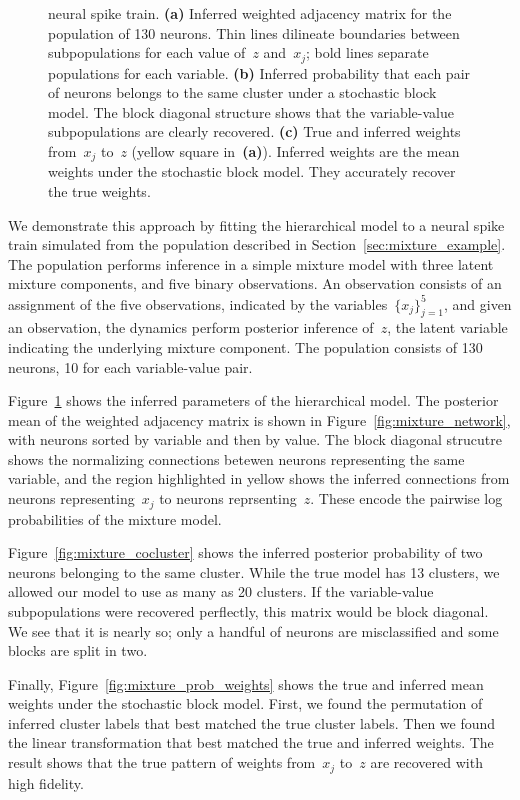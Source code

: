 \begin{figure}[t!]
{   neural spike train.
   \textbf{(a)} Inferred weighted adjacency matrix for the population
   of 130 neurons. Thin lines dilineate boundaries between subpopulations
   for each value of~$z$ and~$x_j$; bold lines separate populations for
   each variable. 
   \textbf{(b)} Inferred probability that each pair of neurons belongs to
   the same cluster under a stochastic block model.
   The block diagonal structure shows that the
   variable-value subpopulations are clearly recovered.
   \textbf{(c)} True and inferred weights
   from~$x_j$ to~$z$ (yellow square in~\textbf{(a)}). Inferred weights
   are the mean weights under the stochastic block model. They accurately
   recover the true weights.
 }
 \label{fig:mixture_recovery}
\end{figure}

We demonstrate this approach by 
fitting the hierarchical model to a neural spike train simulated
from the population described in
Section~\ref{sec:mixture_example}. The population performs inference
in a simple mixture model with three latent mixture components,
and five binary observations. An observation consists of an assignment
of the five observations, indicated
by the variables~$\{x_j\}_{j=1}^5$, and given an observation, the dynamics
perform posterior inference of~$z$, the latent variable indicating the
underlying mixture component. The population consists of 130 neurons, 10 for
each variable-value pair.



Figure~\ref{fig:mixture_recovery} shows the inferred parameters of the
hierarchical model. The posterior mean of the weighted adjacency
matrix is shown in Figure~\ref{fig:mixture_network}, with neurons sorted
by variable and then by value. The block diagonal strucutre shows
the normalizing connections betewen neurons representing the same variable,
and the region highlighted in yellow shows the inferred connections from
neurons representing~$x_j$ to neurons reprsenting~$z$. These encode
the pairwise log probabilities of the mixture model.

Figure~\ref{fig:mixture_cocluster} shows the inferred posterior probability
of two neurons belonging to the same cluster. While the true model has
13 clusters, we allowed our model to use as many as 20 clusters.
If the variable-value subpopulations
were recovered perflectly, this matrix would be block diagonal. We
see that it is nearly so; only a handful of neurons are misclassified
and some blocks are split in two.

Finally, Figure~\ref{fig:mixture_prob_weights} shows the true and inferred
mean weights under the stochastic block model. First, we found the permutation
of inferred cluster labels that best matched the true cluster labels. Then we found the
linear transformation that best matched the true and inferred weights.
The result shows that the true pattern of weights from~$x_j$ to~$z$ are
recovered with high fidelity.

